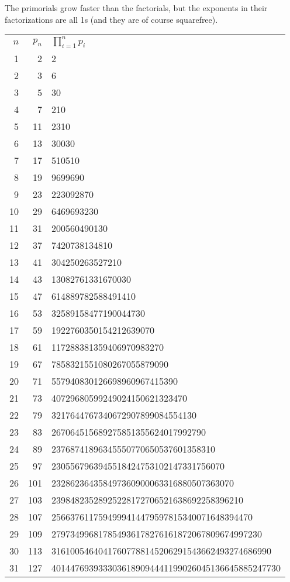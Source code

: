 \documentclass[12pt]{article}
\begin{document}
The primorials grow faster than the factorials, but the exponents in their factorizations are all 1s (and they are of course squarefree).

\begin{tabular}{|r|r|l|}
$n$ & $p_n$ & $\displaystyle \prod_{i = 1}^n p_i$ \\
1 & 2 & 2 \\
2 & 3 & 6 \\
3 & 5 & 30 \\
4 & 7 & 210 \\
5 & 11 & 2310 \\
6 & 13 & 30030 \\
7 & 17 & 510510 \\
8 & 19 & 9699690 \\
9 & 23 & 223092870 \\
10 & 29 & 6469693230 \\
11 & 31 & 200560490130 \\
12 & 37 & 7420738134810 \\
13 & 41 & 304250263527210 \\
14 & 43 & 13082761331670030 \\
15 & 47 & 614889782588491410 \\
16 & 53 & 32589158477190044730 \\
17 & 59 & 1922760350154212639070 \\
18 & 61 & 117288381359406970983270 \\
19 & 67 & 7858321551080267055879090 \\
20 & 71 & 557940830126698960967415390 \\
21 & 73 & 40729680599249024150621323470 \\
22 & 79 & 3217644767340672907899084554130 \\
23 & 83 & 267064515689275851355624017992790 \\
24 & 89 & 23768741896345550770650537601358310 \\
25 & 97 & 2305567963945518424753102147331756070 \\
26 & 101 & 232862364358497360900063316880507363070 \\
27 & 103 & 23984823528925228172706521638692258396210 \\
28 & 107 & 2566376117594999414479597815340071648394470 \\
29 & 109 & 279734996817854936178276161872067809674997230 \\
30 & 113 & 31610054640417607788145206291543662493274686990 \\
31 & 127 & 4014476939333036189094441199026045136645885247730 \\

\end{tabular}
\end{document}
